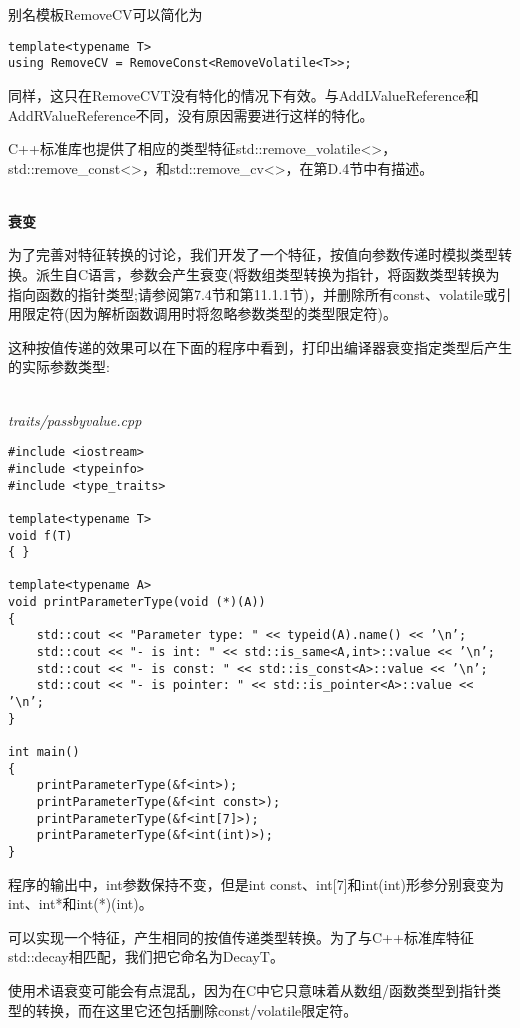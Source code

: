 别名模板RemoveCV可以简化为

\begin{lstlisting}[style=styleCXX]
template<typename T>
using RemoveCV = RemoveConst<RemoveVolatile<T>>;
\end{lstlisting}

同样，这只在RemoveCVT没有特化的情况下有效。与AddLValueReference和AddRValueReference不同，没有原因需要进行这样的特化。

C++标准库也提供了相应的类型特征std::remove\_volatile<>， std::remove\_const<>，和std::remove\_cv<>，在第D.4节中有描述。

\hspace*{\fill} \\ %
\noindent
\textbf{衰变}

为了完善对特征转换的讨论，我们开发了一个特征，按值向参数传递时模拟类型转换。派生自C语言，参数会产生衰变(将数组类型转换为指针，将函数类型转换为指向函数的指针类型;请参阅第7.4节和第11.1.1节)，并删除所有const、volatile或引用限定符(因为解析函数调用时将忽略参数类型的类型限定符)。

这种按值传递的效果可以在下面的程序中看到，打印出编译器衰变指定类型后产生的实际参数类型:

\hspace*{\fill} \\ %
\noindent
\textit{traits/passbyvalue.cpp}
\begin{lstlisting}[style=styleCXX]
#include <iostream>
#include <typeinfo>
#include <type_traits>

template<typename T>
void f(T)
{ }

template<typename A>
void printParameterType(void (*)(A))
{
	std::cout << "Parameter type: " << typeid(A).name() << ’\n’;
	std::cout << "- is int: " << std::is_same<A,int>::value << ’\n’;
	std::cout << "- is const: " << std::is_const<A>::value << ’\n’;
	std::cout << "- is pointer: " << std::is_pointer<A>::value << ’\n’;
}

int main()
{
	printParameterType(&f<int>);
	printParameterType(&f<int const>);
	printParameterType(&f<int[7]>);
	printParameterType(&f<int(int)>);
}
\end{lstlisting}

程序的输出中，int参数保持不变，但是int const、int[7]和int(int)形参分别衰变为int、int*和int(*)(int)。

可以实现一个特征，产生相同的按值传递类型转换。为了与C++标准库特征std::decay相匹配，我们把它命名为DecayT。

\begin{tcolorbox}[colback=webgreen!5!white,colframe=webgreen!75!black]
\hspace*{0.75cm}使用术语衰变可能会有点混乱，因为在C中它只意味着从数组/函数类型到指针类型的转换，而在这里它还包括删除const/volatile限定符。
\end{tcolorbox}

